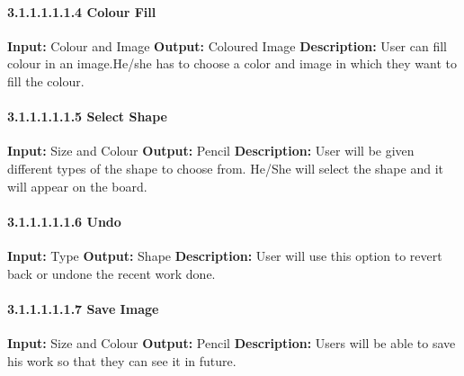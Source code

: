 \documentclass{scrreprt}
\begin{document}
\paragraph{3.1.1.1.1.1.4 Colour Fill}
\hfill \vspace{2.5mm} \break 
\textbf{Input:} Colour and Image \newline
\textbf{Output:} Coloured Image
\vspace{1mm}\newline
\textbf{Description:} \newline 
User can fill colour in an image.He/she has to choose a color and image in which they want to fill the colour.

\paragraph{3.1.1.1.1.1.5 Select Shape}
\hfill \vspace{2.5mm} \break 
\textbf{Input:} Size and Colour \newline
\textbf{Output:} Pencil
\vspace{1mm}\newline
\textbf{Description:} \newline 
User will be given different types of the shape to choose from. He/She will select the shape and it will appear on the board.

\paragraph{3.1.1.1.1.1.6 Undo}
\hfill \vspace{2.5mm} \break 
\textbf{Input:} Type \newline
\textbf{Output:} Shape
\vspace{1mm}\newline
\textbf{Description:} \newline 
User will use this option to revert back or undone the recent work done.

\paragraph{3.1.1.1.1.1.7 Save Image}
\hfill \vspace{2.5mm} \break 
\textbf{Input:} Size and Colour \newline
\textbf{Output:} Pencil
\vspace{1mm}\newline
\textbf{Description:} \newline 
Users will be able to save his work so that they can see it in future.
\end{document}
